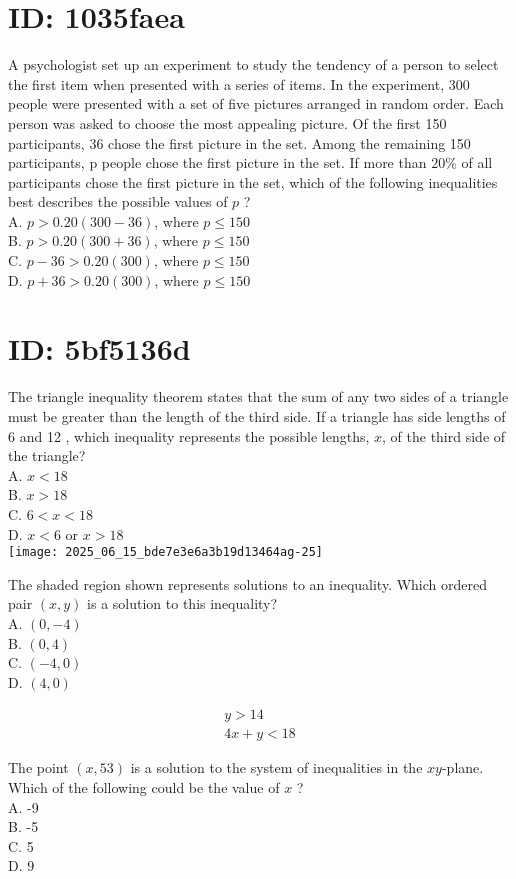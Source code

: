 \section*{ID: 1035faea}
A psychologist set up an experiment to study the tendency of a person to select the first item when presented with a series of items. In the experiment, 300 people were presented with a set of five pictures arranged in random order. Each person was asked to choose the most appealing picture. Of the first 150 participants, 36 chose the first picture in the set. Among the remaining 150 participants, p people chose the first picture in the set. If more than $20 \%$ of all participants chose the first picture in the set, which of the following inequalities best describes the possible values of $p$ ?\\
A. $p>0.20(300-36)$, where $p \leq 150$\\
B. $p>0.20(300+36)$, where $p \leq 150$\\
C. $p-36>0.20(300)$, where $p \leq 150$\\
D. $p+36>0.20(300)$, where $p \leq 150$

\section*{ID: 5bf5136d}
The triangle inequality theorem states that the sum of any two sides of a triangle must be greater than the length of the third side. If a triangle has side lengths of 6 and 12 , which inequality represents the possible lengths, $x$, of the third side of the triangle?\\
A. $x<18$\\
B. $x>18$\\
C. $6<x<18$\\
D. $x<6$ or $x>18$\\
\texttt{[image: 2025\_06\_15\_bde7e3e6a3b19d13464ag-25]}

The shaded region shown represents solutions to an inequality. Which ordered pair $(x, y)$ is a solution to this inequality?\\
A. $(0,-4)$\\
B. $(0,4)$\\
C. $(-4,0)$\\
D. $(4,0)$

$$
\begin{gathered}
y>14 \\
4 x+y<18
\end{gathered}
$$

The point $(x, 53)$ is a solution to the system of inequalities in the $x y$-plane. Which of the following could be the value of $x$ ?\\
A. -9\\
B. -5\\
C. 5\\
D. 9

